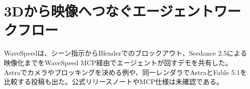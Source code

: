 \section{3Dから映像へつなぐエージェントワークフロー}
WaveSpeedは、シーン指示からBlenderでのブロックアウト、Seedance 2.5による映像化までをWaveSpeed MCP経由でエージェントが回すデモを共有した。Astraでカメラやブロッキングを決める例や、同一レンダラでAstraとFable 5.1を比較する投稿も出た。公式リリースノートやMCP仕様は未確認である。
